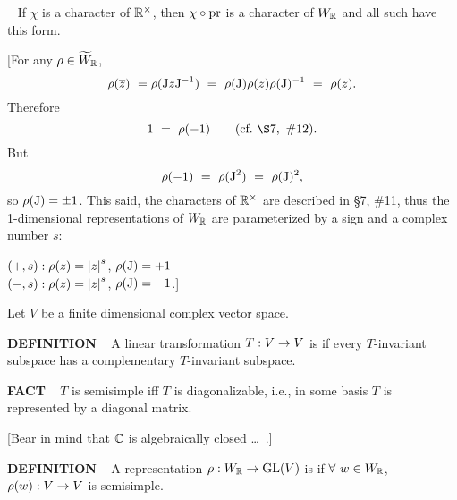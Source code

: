 \begin{x}{\small\bf {}} \ %
If $\chi$ is a character of $\mathbb{R}^\times$, then $\chi \circ \text{pr}$ is a character of $W_{\mathbb{R}}$ and all such have this form.

[For any $\rho \in \widetilde{W}_{\mathbb{R}}$, 
\[
\rho(\overline{z}) \ = \rho(\text{J} z \text{J}^{-1}) \ = \  \rho(\text{J}) \rho(z) \rho(\text{J})^{-1} \ = \  \rho(z).
\]
Therefore
\[
1 \ = \ \rho(-1) \qquad (\text{cf.} \ \S7, \ \#12).
\]
But 
\[
\rho(-1) \ = \ \rho(\tJ^2) \ = \ \rho(\tJ)^2,
\]
so $\rho(\text{J}) = \pm1$.  This said, the characters of $\mathbb{R}^\times$ are described in \S7, \#11, thus the 1-dimensional 
representations of $W_{\mathbb{R}}$ are parameterized by a sign and a complex number $s$:

\qquad \textbullet \quad $(+,s): \rho(z) = \left\vert z\right\vert^s$, $\rho(\text{J}) = + 1$\\

\qquad \textbullet \quad $(-,s): \rho(z) = \left\vert z\right\vert^s$, $\rho(\text{J}) = - 1$.]\\

\vspace{0.1cm}

Let $V$ be a finite dimensional complex vector space.

\vspace{0.1cm}


\end{x}
\vspace{0.1cm}

\begin{x}{\small\bf DEFINITION} \ %
A linear transformation $T:V \rightarrow V$ is 
if every $T$-invariant subspace has a complementary $T$-invariant subspace.
\end{x}
\vspace{0.1cm}

\begin{x}{\small\bf FACT} \ %
$T$ is semisimple iff $T$ is diagonalizable, i.e., in some basis $T$ is represented by a diagonal matrix.

\vspace{0.05cm}

[Bear in mind that $\mathbb{C}$ is algebraically closed \ldots \ .]
\end{x}

\vspace{0.1cm}

\begin{x}{\small\bf DEFINITION} \ %
A representation $\rho:W_{\mathbb{R}} \rightarrow \text{GL}(V)$ is 
if $\forall \ w \in W_{\mathbb{R}}$, 
$\rho(w):V \rightarrow V$ is semisimple.
\end{x}
\vspace{0.1cm}

